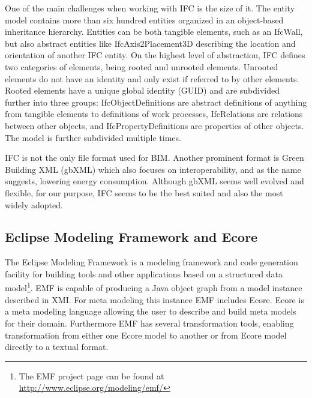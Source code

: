 One of the main challenges when working with IFC is the size of it. The entity model contains more than six hundred entities organized in an object-based inheritance hierarchy. Entities can be both tangible elements, such as an IfcWall, but also abstract entities like IfcAxis2Placement3D describing the location and orientation of another IFC entity. On the highest level of abstraction, IFC defines two categories of elements, being rooted and unrooted elements. Unrooted elements do not have an identity and only exist if referred to by other elements. Rooted elements have a unique global identity (GUID) and are subdivided further into three groups: IfcObjectDefinitions are abstract definitions of anything from tangible elements to definitions of work processes, IfcRelations are relations between other objects, and IfcPropertyDefinitions are properties of other objects. The model is further subdivided multiple times.

IFC is not the only file format used for BIM. Another prominent format is Green Building XML (gbXML) which also focuses on interoperability, and as the name suggests, lowering energy consumption. Although gbXML seems well evolved and flexible, for our purpose, IFC seems to be the best suited and also the most widely adopted.

\subsection{Eclipse Modeling Framework and Ecore}
The Eclipse Modeling Framework is a modeling framework and code generation facility for building tools and other applications based on a structured data model\footnote{The EMF project page can be found at \url{http://www.eclipse.org/modeling/emf/}}. EMF is capable of producing a Java object graph from a model instance described in XMI. For meta modeling this instance EMF includes Ecore. Ecore is a meta modeling language allowing the user to describe and build meta models for their domain. Furthermore EMF has several transformation tools, enabling transformation from either one Ecore model to another or from Ecore model directly to a textual format.
